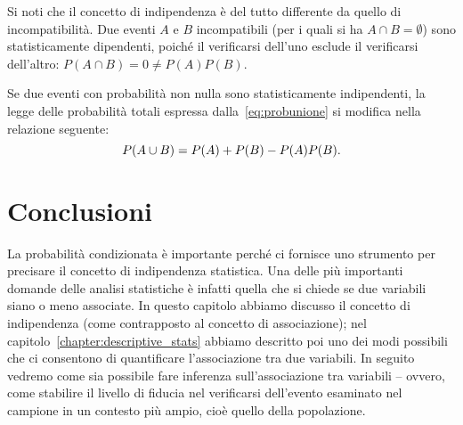 \begin{oss}
Si noti che il concetto di indipendenza è del tutto differente da quello di incompatibilità. 
Due eventi $A$ e $B$ incompatibili (per i quali si ha $A \cap B = \emptyset$) sono statisticamente dipendenti, poiché il verificarsi dell'uno esclude il verificarsi dell'altro: $P(A \cap B)=0  \neq P(A)P(B)$. 
\end{oss}

\begin{oss}
Se due eventi con probabilità non nulla sono statisticamente indipendenti, la legge delle probabilità totali espressa dalla~\eqref{eq:probunione} si modifica nella relazione seguente:
\begin{equation}
P(A \cup B) = P(A) + P(B) - P(A)P(B).\notag
\end{equation}
\end{oss}

\section*{Conclusioni}

La probabilità condizionata è importante perché ci fornisce uno strumento per precisare il concetto di indipendenza statistica.
Una delle più importanti domande delle analisi statistiche è infatti quella che si chiede se due variabili siano o meno associate.
In questo capitolo abbiamo discusso il concetto di indipendenza (come contrapposto al concetto di associazione); nel capitolo~\ref{chapter:descriptive_stats} abbiamo descritto poi uno dei modi possibili che ci consentono di quantificare l'associazione tra due variabili.
In seguito vedremo come sia possibile fare inferenza sull'associazione tra variabili -- ovvero, come stabilire il livello di fiducia nel verificarsi dell'evento esaminato nel campione in un contesto più ampio, cioè quello della popolazione.
 


